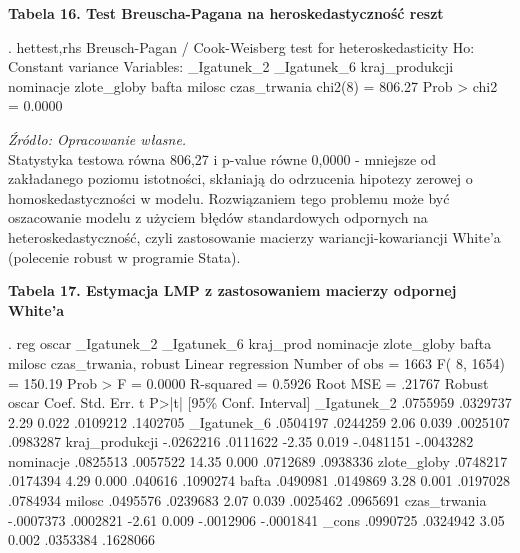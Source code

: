  \vspace{0.5cm}

\textbf{Tabela 16. Test Breuscha-Pagana na heroskedastyczność reszt}
\begin{stlog}	

. hettest,rhs 
{\smallskip}
Breusch-Pagan / Cook-Weisberg test for heteroskedasticity 
         Ho: Constant variance
         Variables: _Igatunek_2 _Igatunek_6 kraj_produkcji nominacje
                    zlote_globy bafta milosc czas_trwania
{\smallskip}
         chi2(8)      =   806.27
         Prob > chi2  =   0.0000

\end{stlog}

\textit{\footnotesize{Źródło: Opracowanie własne.}} \\	

Statystyka testowa równa 806,27 i p-value równe 0,0000 - mniejsze od zakładanego poziomu istotności, skłaniają do odrzucenia hipotezy zerowej o homoskedastyczności w modelu. Rozwiązaniem tego problemu może być oszacowanie modelu z użyciem błędów standardowych odpornych na heteroskedastyczność, czyli zastosowanie macierzy wariancji-kowariancji White'a (polecenie robust w programie Stata).

 \vspace{0.5cm}

\textbf{Tabela 17. Estymacja LMP  z zastosowaniem macierzy odpornej White'a}
\begin{stlog}	

. reg oscar _Igatunek_2 _Igatunek_6 kraj_prod nominacje zlote_globy bafta milosc czas_trwania, robust
{\smallskip}
Linear regression                                      Number of obs =    1663
                                                       F(  8,  1654) =  150.19
                                                       Prob > F      =  0.0000
                                                       R-squared     =  0.5926
                                                       Root MSE      =  .21767
{\smallskip}
               {\VBAR}               Robust
         oscar {\VBAR}      Coef.   Std. Err.      t    P>|t|     [95\% Conf. Interval]
   _Igatunek_2 {\VBAR}   .0755959   .0329737     2.29   0.022     .0109212    .1402705
   _Igatunek_6 {\VBAR}   .0504197   .0244259     2.06   0.039     .0025107    .0983287
kraj_produkcji {\VBAR}  -.0262216   .0111622    -2.35   0.019    -.0481151   -.0043282
     nominacje {\VBAR}   .0825513   .0057522    14.35   0.000     .0712689    .0938336
   zlote_globy {\VBAR}   .0748217   .0174394     4.29   0.000      .040616    .1090274
         bafta {\VBAR}   .0490981   .0149869     3.28   0.001     .0197028    .0784934
        milosc {\VBAR}   .0495576   .0239683     2.07   0.039     .0025462    .0965691
  czas_trwania {\VBAR}  -.0007373   .0002821    -2.61   0.009    -.0012906   -.0001841
         _cons {\VBAR}   .0990725   .0324942     3.05   0.002     .0353384    .1628066

\end{stlog}

